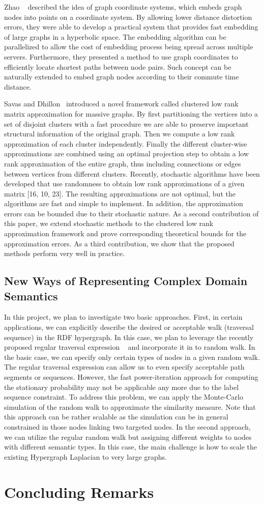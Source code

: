 Zhao \etal~\cite{ZhaoEtal2011Eff} described the idea of graph coordinate systems, which embeds graph nodes into points on a coordinate system. By allowing lower distance distortion errors, they were able to develop a practical system that provides fast embedding of large graphs in a hyperbolic space. The embedding algorithm can be parallelized to allow the cost of embedding process being spread across multiple servers. Furthermore, they presented a method to use graph coordinates to efficiently locate shortest paths between node pairs. Such concept can be naturally extended to embed graph nodes according to their commute time distance.

Savas and Dhillon~\cite{SavasEtal2011Clu} introduced a novel framework called clustered low rank matrix approximation for massive graphs. By first partitioning the vertices into a set of disjoint clusters with a fast procedure we are able to preserve important structural information of the original graph. Then we compute a low rank approximation of each cluster independently. Finally the different cluster-wise approximations are combined using an optimal projection step to obtain a low rank approximation of the entire graph, thus including connections or edges between vertices from different clusters. Recently, stochastic algorithms have been developed that use randomness to obtain low rank approximations of a given matrix [16, 10, 23]. The resulting approximations are not optimal, but the algorithms are fast and simple to implement. In addition, the approximation errors can be bounded due to their stochastic nature. As a second contribution of this paper, we extend stochastic methods to the clustered low rank approximation framework and prove corresponding theoretical bounds for the approximation errors. As a third contribution, we show that the proposed methods perform very well in practice. 

\subsection{New Ways of Representing Complex Domain Semantics}
In this project, we plan to investigate two basic approaches.
First, in certain applications, we can explicitly describe the desired or acceptable walk (traversal sequence) in the RDF hypergraph. In this case, we plan to leverage the recently proposed regular traversal expression ~\cite{Marko10} and incorporate it in to random walk. In the basic case, we can specify only certain types of nodes in a given random walk. The regular traversal expression can allow us to even specify acceptable path segments or sequences.
However, the fast power-iteration approach for computing the stationary probability may not be applicable any more due to the label sequence constraint.
To address this problem, we can apply the Monte-Carlo simulation of the random walk to approximate the similarity measure. Note that this approach can be rather scalable as the simulation can be in general constrained in those nodes linking two targeted nodes.
In the second approach, we can utilize the regular random walk but assigning different  weights to nodes with different semantic types. In this case, the main challenge is how to scale the existing  Hypergraph Laplacian to very large graphs.

\section{Concluding Remarks}